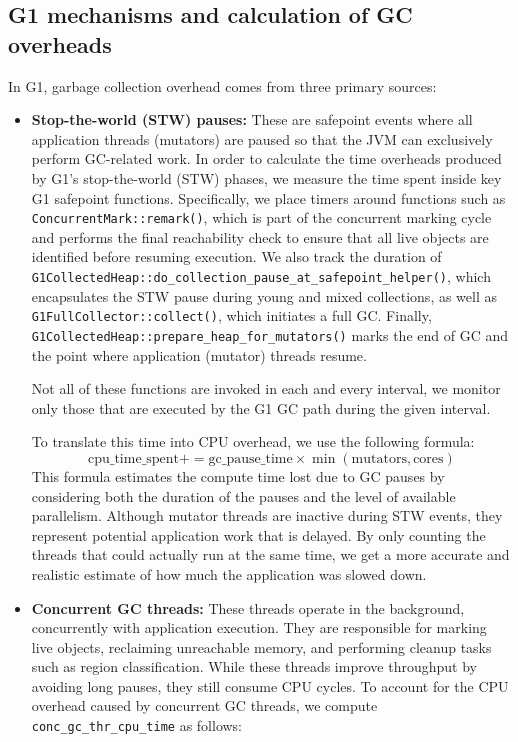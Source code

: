 \subsection{G1 mechanisms and calculation of GC overheads}
In G1, garbage collection overhead comes from three primary sources:

\begin{itemize}
  \item \textbf{Stop-the-world (STW) pauses:} These are safepoint events
  where all application threads (mutators) are paused so that the JVM can exclusively perform 
  GC-related work. In order to calculate the time overheads produced by G1’s stop-the-world (STW) phases, we measure the time spent inside key G1 safepoint functions. 
  Specifically, we place timers around functions such as \texttt{ConcurrentMark::remark()}, which is part of the concurrent marking cycle and performs the final reachability check to ensure that all live objects are identified before resuming execution. 
  We also track the duration of \texttt{G1CollectedHeap::do\allowbreak\_collection\allowbreak\_pause\allowbreak\_at\allowbreak\_safepoint\allowbreak\_helper()}, which encapsulates the STW pause during young and mixed collections, as well as \texttt{G1FullCollector::collect()}, which initiates a full GC. 
  Finally, \texttt{G1CollectedHeap::prepare\_heap\_for\_mutators()} marks the end of GC and the point where application (mutator) threads resume.

  Not all of these functions are invoked in each and every interval, we monitor only those that are executed by the G1 GC path during the given interval. 

  To translate this time into CPU overhead, we use the following formula:
  \[
  \text{cpu\_time\_spent} += \text{gc\_pause\_time} \times \min(\text{mutators}, \text{cores})
  \]
  This formula estimates the compute time lost due to GC pauses by considering both the duration of the pauses and the level of available parallelism. 
  Although mutator threads are inactive during STW events, they represent potential application work that is delayed. 
  By only counting the threads that could actually run at the same time, we get a more accurate and realistic estimate of how much the application was slowed down. 

  \item \textbf{Concurrent GC threads:} These threads operate in the background,
  concurrently with application execution. They are responsible for marking live 
  objects, reclaiming unreachable memory, and performing cleanup tasks such as region 
  classification. While these threads improve throughput by avoiding long pauses, they 
  still consume CPU cycles.
  To account for the CPU overhead caused by concurrent GC threads, we compute \texttt{conc\_gc\_thr\_cpu\_time} as follows:


\end{itemize}
